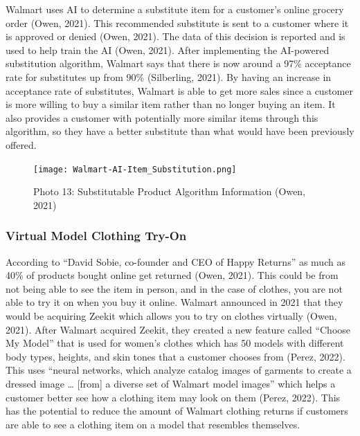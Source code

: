 \documentclass[
]{article}
\begin{document}
Walmart uses AI to determine a substitute item for a customer's online grocery order (Owen, 2021). This recommended substitute is sent to a customer where it is approved or denied (Owen, 2021). The data of this decision is reported and is used to help train the AI (Owen, 2021). After implementing the AI-powered substitution algorithm, Walmart says that there is now around a 97\% acceptance rate for substitutes up from 90\% (Silberling, 2021). By having an increase in acceptance rate of substitutes, Walmart is able to get more sales since a customer is more willing to buy a similar item rather than no longer buying an item. It also provides a customer with potentially more similar items through this algorithm, so they have a better substitute than what would have been previously offered.

\begin{figure}
\centering
\texttt{[image: Walmart-AI-Item\_Substitution.png]}
\caption{Photo 13: Substitutable Product Algorithm Information (Owen, 2021)}
\end{figure}

\hypertarget{virtual-model-clothing-try-on}{%
\subsubsection{Virtual Model Clothing Try-On}\label{virtual-model-clothing-try-on}}

According to ``David Sobie, co-founder and CEO of Happy Returns'' as much as 40\% of products bought online get returned (Owen, 2021). This could be from not being able to see the item in person, and in the case of clothes, you are not able to try it on when you buy it online. Walmart announced in 2021 that they would be acquiring Zeekit which allows you to try on clothes virtually (Owen, 2021). After Walmart acquired Zeekit, they created a new feature called ``Choose My Model'' that is used for women's clothes which has 50 models with different body types, heights, and skin tones that a customer chooses from (Perez, 2022). This uses ``neural networks, which analyze catalog images of garments to create a dressed image \ldots{} {[}from{]} a diverse set of Walmart model images'' which helps a customer better see how a clothing item may look on them (Perez, 2022). This has the potential to reduce the amount of Walmart clothing returns if customers are able to see a clothing item on a model that resembles themselves.
\end{document}
